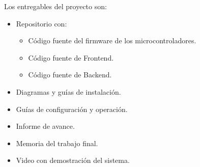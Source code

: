 Los entregables del proyecto son:
\begin{itemize}
	\item Repositorio con:
	      \begin{itemize}
		      \item Código fuente del firmware de los microcontroladores.
		      \item Código fuente de Frontend.
		      \item Código fuente de Backend.
	      \end{itemize}
	\item Diagramas y guías de instalación.
	\item Guías de configuración y operación.
	\item Informe de avance.
	\item Memoria del trabajo final.
	\item Video con demostración del sistema.
\end{itemize}